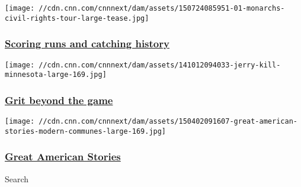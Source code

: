 \href{/2015/07/24/us/anderson-monarchs-bus-tour/index.html}{}

\texttt{[image: //cdn.cnn.com/cnnnext/dam/assets/150724085951-01-monarchs-civil-rights-tour-large-tease.jpg]}

\hypertarget{scoring-runs-and-catching-history}{%
\subsubsection{\texorpdfstring{\href{/2015/07/24/us/anderson-monarchs-bus-tour/index.html}{Scoring
runs and catching
history}}{Scoring runs and catching history}}\label{scoring-runs-and-catching-history}}

\href{http://www.cnn.com/interactive/2014/10/us/epilepsy-football-coach/index.html}{}

\texttt{[image: //cdn.cnn.com/cnnnext/dam/assets/141012094033-jerry-kill-minnesota-large-169.jpg]}

\hypertarget{grit-beyond-the-game}{%
\subsubsection{\texorpdfstring{\href{http://www.cnn.com/interactive/2014/10/us/epilepsy-football-coach/index.html}{Grit
beyond the game}}{Grit beyond the game}}\label{grit-beyond-the-game}}

\href{/specials/us/great-american-stories}{}

\texttt{[image: //cdn.cnn.com/cnnnext/dam/assets/150402091607-great-american-stories-modern-communes-large-169.jpg]}

\hypertarget{great-american-stories}{%
\subsubsection{\texorpdfstring{\href{/specials/us/great-american-stories}{Great
American
Stories}}{Great American Stories}}\label{great-american-stories}}

Search

